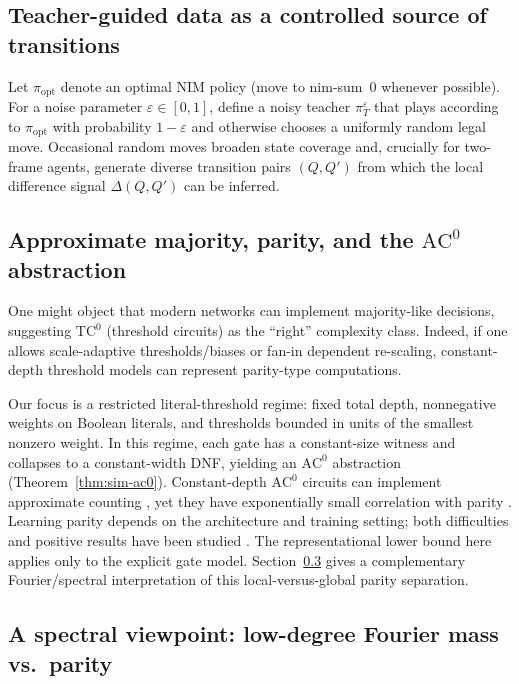 \documentclass[11pt]{article}
\newcommand{\AC}{\mathrm{AC}}
\newcommand{\TC}{\mathrm{TC}}
\theoremstyle{plain}
\theoremstyle{definition}
\theoremstyle{remark}
\numberwithin{equation}{section}
\begin{document}
\subsection{Teacher-guided data as a controlled source of transitions}
\label{sec:teacher}

Let $\pi_{\mathrm{opt}}$ denote an optimal NIM policy (move to nim-sum~$0$ whenever possible).
For a noise parameter $\varepsilon\in[0,1]$, define a noisy teacher $\pi_T^{\varepsilon}$ that plays according to $\pi_{\mathrm{opt}}$ with probability $1-\varepsilon$ and otherwise chooses a uniformly random legal move.
Occasional random moves broaden state coverage and, crucially for two-frame agents, generate diverse transition pairs $(Q,Q')$ from which the local difference signal $\Delta(Q,Q')$ can be inferred.

\subsection{Approximate majority, parity, and the \texorpdfstring{$\AC^0$}{AC0} abstraction}
\label{sec:majority-vs-parity}

One might object that modern networks can implement majority-like decisions, suggesting $\TC^0$ (threshold circuits) as the ``right'' complexity class.
Indeed, if one allows scale-adaptive thresholds/biases or fan-in dependent re-scaling, constant-depth threshold models can represent parity-type computations.

Our focus is a restricted literal-threshold regime: fixed total depth, nonnegative weights on Boolean literals, and thresholds bounded in units of the smallest nonzero weight.
In this regime, each gate has a constant-size witness and collapses to a constant-width DNF, yielding an $\AC^0$ abstraction (Theorem~\ref{thm:sim-ac0}).
Constant-depth $\AC^0$ circuits can implement approximate counting \cite{ajtai1993approxcount}, yet they have exponentially small correlation with parity \cite{furst1984parity,hastad1986thesis,smolensky1987algebraic,razborov1987lower}.
Learning parity depends on the architecture and training setting; both difficulties and positive results have been studied \cite{thornton1996parity,thornton1996bp,daniely2020parities}. The representational lower bound here applies only to the explicit gate model.
Section~\ref{sec:spectral-view} gives a complementary Fourier/spectral interpretation of this local-versus-global parity separation.

\subsection{A spectral viewpoint: low-degree Fourier mass vs.\ parity}
\label{sec:spectral-view}
\end{document}

